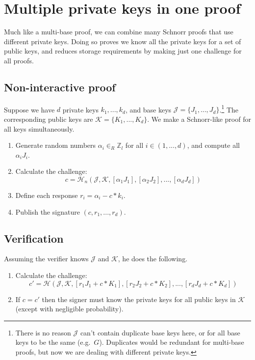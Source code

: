 \section{Multiple private keys in one proof}
\label{sec:multiple_private_keys_in_one_proof}

Much like a multi-base proof, we can combine many Schnorr proofs that use different private keys. Doing so proves we know all the private keys for a set of public keys, and reduces storage requirements by making just one challenge for all proofs.


\subsection*{Non-interactive proof}

Suppose we have $d$ private keys $k_1,...,k_d$, and base keys $\mathcal{J} = \{J_1,...,J_d\}$.\footnote{There is no reason $\mathcal{J}$ can't contain duplicate base keys here, or for all base keys to be the same (e.g.\ $G$). Duplicates would be redundant for multi-base proofs, but now we are dealing with different private keys.} The corresponding public keys are $\mathcal{K} = \{K_1,...,K_d\}$. We make a Schnorr-like proof for all keys simultaneously.

\begin{enumerate}
	\item Generate random numbers $\alpha_i \in_R \mathbb{Z}_l$ for all $i \in (1,...,d)$, and compute all $\alpha_i J_i$.
	\item Calculate the challenge:\vspace{.155cm}
	\[c = \mathcal{H}_n(\mathcal{J},\mathcal{K},[\alpha_1 J_1],[\alpha_2 J_2],...,[\alpha_d J_d])\]
	\item Define each response $r_i = \alpha_i - c*k_i$.
	\item Publish the signature $(c, r_1,...,r_d)$.
\end{enumerate}


\subsection*{Verification}

Assuming the verifier knows $\mathcal{J}$ and $\mathcal{K}$, he does the following.

\begin{enumerate}
	\item Calculate the challenge:\vspace{.175cm}
	\[c' = \mathcal{H}(\mathcal{J},\mathcal{K},[r_1 J_1 + c*K_1],[r_2 J_2 + c*K_2],...,[r_d J_d + c*K_d])\]
	\item If $c = c'$ then the signer must know the private keys for all public keys in $\mathcal{K}$ (except with negligible probability).
\end{enumerate}



